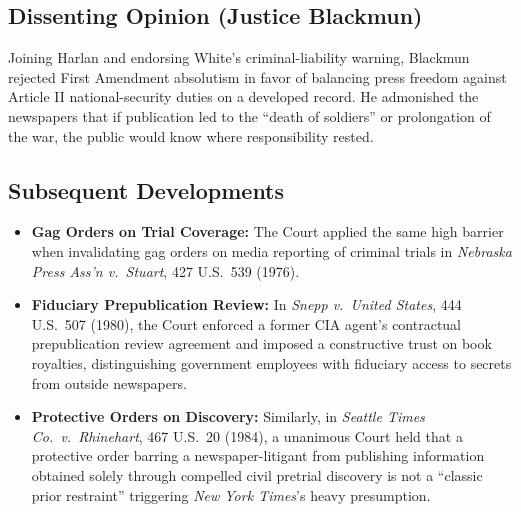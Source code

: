 \documentclass[12pt]{article}
\begin{document}
\subsection{Dissenting Opinion (Justice Blackmun)}

Joining Harlan and endorsing White's criminal-liability warning, Blackmun rejected First Amendment absolutism in favor of balancing press freedom against Article II national-security duties on a developed record. He admonished the newspapers that if publication led to the ``death of soldiers'' or prolongation of the war, the public would know where responsibility rested.

\subsection{Subsequent Developments}

\begin{itemize}

\item \textbf{Gag Orders on Trial Coverage:} The Court applied the same high barrier when invalidating gag orders on media reporting of criminal trials in \textit{Nebraska Press Ass'n v.\ Stuart}, 427 U.S.\ 539 (1976).

\item \textbf{Fiduciary Prepublication Review:} In \textit{Snepp v.\ United States}, 444 U.S.\ 507 (1980), the Court enforced a former CIA agent's contractual prepublication review agreement and imposed a constructive trust on book royalties, distinguishing government employees with fiduciary access to secrets from outside newspapers.

\item \textbf{Protective Orders on Discovery:} Similarly, in \textit{Seattle Times Co.\ v.\ Rhinehart}, 467 U.S.\ 20 (1984), a unanimous Court held that a protective order barring a newspaper-litigant from publishing information obtained solely through compelled civil pretrial discovery is not a ``classic prior restraint'' triggering \textit{New York Times}'s heavy presumption.

\end{itemize}
\end{document}

